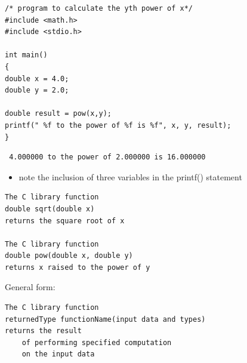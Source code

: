 \documentclass{beamer}
\begin{document}
\begin{frame}[fragile]
\begin{block}{}
\begin {lstlisting}
/* program to calculate the yth power of x*/
#include <math.h>    
#include <stdio.h>    

int main()    
{    
double x = 4.0; 
double y = 2.0;
 
double result = pow(x,y);    
printf(" %
}  
\end{lstlisting}
\end{block}

\begin{block}{}
\begin{lstlisting}
 4.000000 to the power of 2.000000 is 16.000000
\end{lstlisting}
\end{block}

\begin{itemize} 
\item note the inclusion of three variables in the printf() statement
\end{itemize}
\end{frame}

\begin{frame}[fragile]
\begin{block}{}
\begin{lstlisting}
The C library function 
double sqrt(double x) 
returns the square root of x

The C library function 
double pow(double x, double y) 
returns x raised to the power of y
\end{lstlisting}
\end{block}
General form:
\begin{block}{}
\begin{lstlisting}
The C library function 
returnedType functionName(input data and types)
returns the result 
	of performing specified computation 
	on the input data
\end{lstlisting}
\end{block}

\end{frame}
\end{document}
